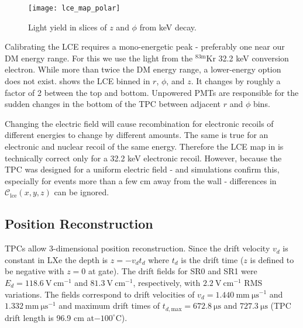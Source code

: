 \begin{figure}
\centering
\texttt{[image: lce\_map\_polar]}
\caption{Light yield in slices of $z$ and $\phi$ from  keV decay.}
\label{fig:calibrations_lce_polar}
\end{figure}

Calibrating the LCE requires a mono-energetic peak - preferably one near our DM energy range.  For this we use the light from the
$\mathrm{^{83m}Kr}$ 32.2 keV conversion electron.  While more than twice the DM energy range, a lower-energy option does
not exist.   shows the LCE binned in $r$, $\phi$, and $z$.  It changes by roughly a factor of 2 between
the top and bottom.  Unpowered PMTs are responsible for the sudden changes in the bottom of the TPC between adjacent $r$ and $\phi$ bins.

Changing the electric field will cause recombination for electronic recoils of different energies to change by different amounts.  The
same is true for an electronic and nuclear recoil of the same energy.  Therefore the LCE map in  is
technically correct only for a 32.2 keV electronic recoil.  However, because the TPC was designed for a uniform electric field - and
simulations confirm this, especially for events more than a few cm away from the wall - differences in
$\mathcal{C}_{\mathrm{lce}}(x, y, z)$ can be ignored.



\subsection{Position Reconstruction}
\label{subsec:det_char_position_reconstruction}
TPCs allow 3-dimensional position reconstruction.  Since the drift velocity $v_d$
is constant in LXe the depth is $z = -v_d t_d$ where $t_d$ is the drift time ($z$ is defined to be negative with
$z = 0$ at gate).  The drift fields for SR0 and SR1 were $E_d = 118.6\ \mathrm{V\ cm^{-1}}$ and $81.3\ \mathrm{V\ cm^{-1}}$,
respectively, with $2.2\ \mathrm{V\ cm^{-1}}$ RMS variations.  The fields correspond to drift velocities of
$v_d = 1.440\ \mathrm{mm\ \mu s^{-1}}$ and $1.332\ \mathrm{mm\ \mu s^{-1}}$ and
maximum drift times of $t_{d, \mathrm{max}} = 672.8\ \mathrm{\mu s}$ and $727.3\ \mathrm{\mu s}$ (TPC drift length is 96.9
cm at$-100^{\circ}\mathrm{C}$).

